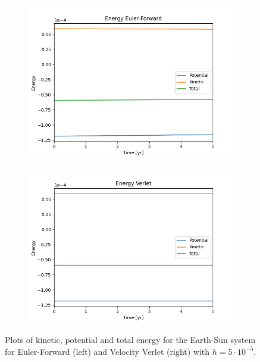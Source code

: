 	\begin{figure}[H]
		\centering
		\begin{subfigure}{0.48\linewidth}
			\includegraphics[width=1.1\linewidth]{Figure/EnergyEuler.png}
		\end{subfigure}
		\begin{subfigure}{0.48\linewidth}
			\includegraphics[width=1.1\linewidth]{Figure/EnergyVerlet.png}
		\end{subfigure}
		\caption{Plots of kinetic, potential and total energy for the Earth-Sun system for Euler-Forward (left) and Velocity Verlet (right) with $h = 5\cdot10^{-5}$.}
		\label{energy2body}
	\end{figure}

